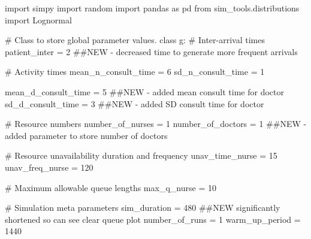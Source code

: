 \documentclass[
  letterpaper,
  DIV=11,
  numbers=noendperiod]{scrreprt}
\newenvironment{Shaded}{}{}
\newcommand{\CommentTok}[1]{\textcolor[rgb]{0.42,0.45,0.49}{#1}}
\newcommand{\DecValTok}[1]{\textcolor[rgb]{0.00,0.36,0.77}{#1}}
\newcommand{\ImportTok}[1]{\textcolor[rgb]{0.01,0.18,0.38}{#1}}
\newcommand{\KeywordTok}[1]{\textcolor[rgb]{0.84,0.23,0.29}{#1}}
\newcommand{\NormalTok}[1]{\textcolor[rgb]{0.14,0.16,0.18}{#1}}
\newcommand{\OperatorTok}[1]{\textcolor[rgb]{0.14,0.16,0.18}{#1}}
\begin{document}
\begin{tcolorbox}[enhanced jigsaw, colframe=quarto-callout-note-color-frame, bottomtitle=1mm, breakable, rightrule=.15mm, coltitle=black, colbacktitle=quarto-callout-note-color!10!white, opacityback=0, leftrule=.75mm, arc=.35mm, toptitle=1mm, title=\textcolor{quarto-callout-note-color}{\faInfo}\hspace{0.5em}{Click here to view the full code}, titlerule=0mm, colback=white, toprule=.15mm, bottomrule=.15mm, left=2mm, opacitybacktitle=0.6]

\begin{Shaded}
\begin{Highlighting}[]
\ImportTok{import}\NormalTok{ simpy}
\ImportTok{import}\NormalTok{ random}
\ImportTok{import}\NormalTok{ pandas }\ImportTok{as}\NormalTok{ pd}
\ImportTok{from}\NormalTok{ sim\_tools.distributions }\ImportTok{import}\NormalTok{ Lognormal}

\CommentTok{\# Class to store global parameter values.}
\KeywordTok{class}\NormalTok{ g:}
    \CommentTok{\# Inter{-}arrival times}
\NormalTok{    patient\_inter }\OperatorTok{=} \DecValTok{2} \CommentTok{\#\#NEW {-} decreased time to generate more frequent arrivals}

    \CommentTok{\# Activity times}
\NormalTok{    mean\_n\_consult\_time }\OperatorTok{=} \DecValTok{6}
\NormalTok{    sd\_n\_consult\_time }\OperatorTok{=} \DecValTok{1}

\NormalTok{    mean\_d\_consult\_time }\OperatorTok{=} \DecValTok{5} \CommentTok{\#\#NEW {-} added mean consult time for doctor}
\NormalTok{    sd\_d\_consult\_time }\OperatorTok{=} \DecValTok{3} \CommentTok{\#\#NEW {-} added SD consult time for doctor}

    \CommentTok{\# Resource numbers}
\NormalTok{    number\_of\_nurses }\OperatorTok{=} \DecValTok{1}
\NormalTok{    number\_of\_doctors }\OperatorTok{=} \DecValTok{1} \CommentTok{\#\#NEW {-} added parameter to store number of doctors}

    \CommentTok{\# Resource unavailability duration and frequency}
\NormalTok{    unav\_time\_nurse }\OperatorTok{=} \DecValTok{15}
\NormalTok{    unav\_freq\_nurse }\OperatorTok{=} \DecValTok{120}

    \CommentTok{\# Maximum allowable queue lengths}
\NormalTok{    max\_q\_nurse }\OperatorTok{=} \DecValTok{10}

    \CommentTok{\# Simulation meta parameters}
\NormalTok{    sim\_duration }\OperatorTok{=} \DecValTok{480} \CommentTok{\#\#NEW significantly shortened so can see clear queue plot}
\NormalTok{    number\_of\_runs }\OperatorTok{=} \DecValTok{1}
\NormalTok{    warm\_up\_period }\OperatorTok{=} \DecValTok{1440}


\end{Highlighting}
\end{Shaded}
\end{tcolorbox}
\end{document}
